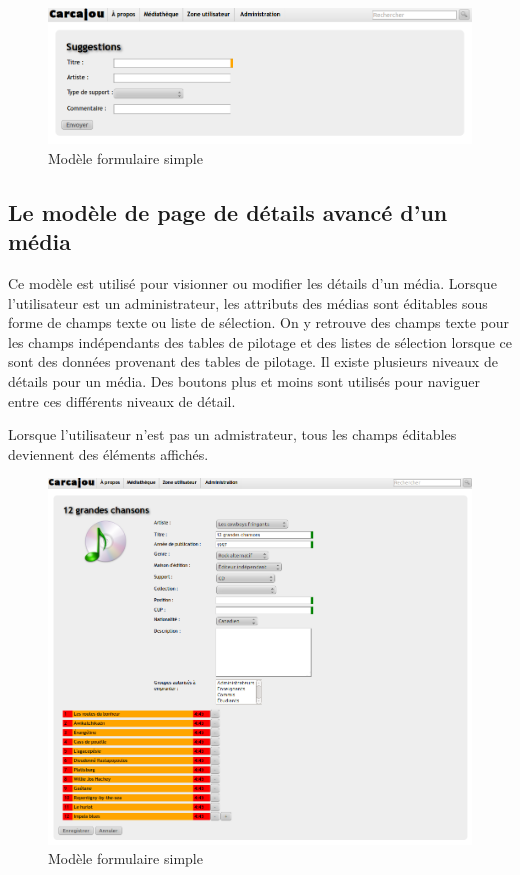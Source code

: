 \documentclass[letter, 11pt]{report}
\begin{document}
\begin{figure}[htbp]
	\begin{center}
		\includegraphics[scale=0.4]{captures_ecran/modele_formulaire_simple.png}
	\end{center}
	\caption{Modèle formulaire simple}
\end{figure}

\subsection{Le modèle de page de détails avancé d'un média}

Ce modèle est utilisé pour visionner ou modifier les détails d'un média. Lorsque l'utilisateur est un administrateur, les attributs des médias sont éditables sous forme de champs texte ou liste de sélection. On y retrouve des champs texte pour les champs indépendants des tables de pilotage et des listes de sélection lorsque ce sont des données provenant des tables de pilotage. Il existe plusieurs niveaux de détails pour un média. Des boutons plus et moins sont utilisés pour naviguer entre ces différents niveaux de détail.

Lorsque l'utilisateur n'est pas un admistrateur, tous les champs éditables deviennent des éléments affichés.

\begin{figure}[htbp]
	\begin{center}
		\includegraphics[scale=0.4]{captures_ecran/modele_details_medias.png}
	\end{center}
	\caption{Modèle formulaire simple}
\end{figure}
\end{document}
